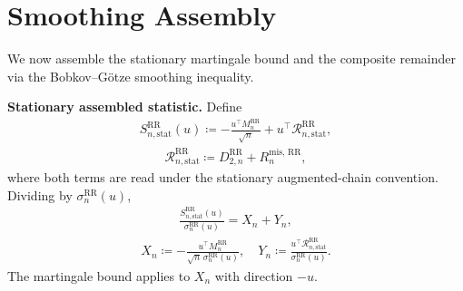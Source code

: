 
\section{Smoothing Assembly}

We now assemble the stationary martingale bound and the composite remainder via
the Bobkov--Götze smoothing inequality.

\textbf{Stationary assembled statistic.} Define
\begin{equation}
\begin{aligned}
S_{n, \text{stat}}^{\text{RR}}(u)
  \coloneqq -\frac{u^\top M_n^{\text{RR}}}{\sqrt{n}} + u^\top \mathcal{R}_{n, \text{stat}}^{\text{RR}},
\end{aligned}
\label{eq:full-decomp}
\end{equation}
\begin{equation}
\begin{aligned}
\mathcal{R}_{n, \text{stat}}^{\text{RR}}
  \coloneqq D_{2, n}^{\text{RR}} + R_n^{\text{mis, RR}},
\end{aligned}
\end{equation}
where both terms are read under the stationary augmented-chain convention.
Dividing by \(\sigma_n^{\text{RR}}(u)\),
\begin{equation}
\begin{aligned}
\frac{S_{n, \text{stat}}^{\text{RR}}(u)}{\sigma_n^{\text{RR}}(u)}
  = X_n + Y_n,
\end{aligned}
\label{eq:XY-split}
\end{equation}
\begin{equation}
\begin{aligned}
X_n \coloneqq -\frac{u^\top M_n^{\text{RR}}}{\sqrt{n} \, \sigma_n^{\text{RR}}(u)},
\quad
Y_n \coloneqq \frac{u^\top \mathcal{R}_{n, \text{stat}}^{\text{RR}}}{\sigma_n^{\text{RR}}(u)}.
\end{aligned}
\end{equation}
The martingale bound applies to \(X_n\) with direction \(-u\).

